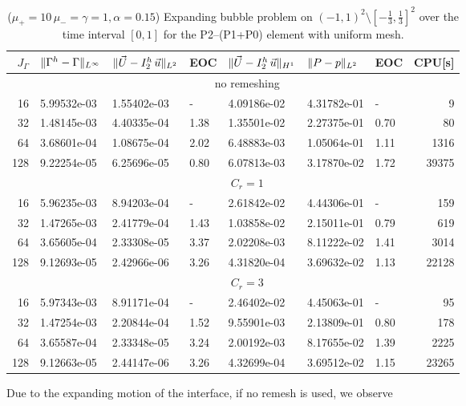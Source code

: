 \begin{table}
\center
\hspace*{-3.25cm}
\begin{tabular}{rllllllr}
\hline
$J_\Gamma$ & $\|\Gamma^h - \Gamma\|_{L^\infty}$ & $\|\vec U - I^h_{2}\,\vec u\|_{L^2}$ & EOC & $\|\vec U - I^h_{2}\,\vec u\|_{H^1}$ & $\|P - p\|_{L^2}$ & EOC
& CPU[s] \\
\hline
& \multicolumn{7}{c}{no remeshing} \\
\hline
 16 & 5.99532e-03 & 1.55402e-03 &    - & 4.09186e-02 & 4.31782e-01 &    - &
9 \\
 32 & 1.48145e-03 & 4.40335e-04 & 1.38 & 1.35501e-02 & 2.27375e-01 & 0.70 &
80 \\
 64 & 3.68601e-04 & 1.08675e-04 & 2.02 & 6.48883e-03 & 1.05064e-01 & 1.11 &
1316 \\
128 & 9.22254e-05 & 6.25696e-05 & 0.80 & 6.07813e-03 & 3.17870e-02 & 1.72 &
39375 \\
\hline
& \multicolumn{7}{c}{$C_r=1$} \\
\hline
 16 & 5.96235e-03 & 8.94203e-04 &    - & 2.61842e-02 & 4.44306e-01 &    - &
159 \\
 32 & 1.47265e-03 & 2.41779e-04 & 1.43 & 1.03858e-02 & 2.15011e-01 & 0.79 &
619 \\
 64 & 3.65605e-04 & 2.33308e-05 & 3.37 & 2.02208e-03 & 8.11222e-02 & 1.41 &
3014 \\
128 & 9.12693e-05 & 2.42966e-06 & 3.26 & 4.31820e-04 & 3.69632e-02 & 1.13 &
22128 \\
\hline
& \multicolumn{7}{c}{$C_r=3$} \\
\hline
 16 & 5.97343e-03 & 8.91171e-04 &    - & 2.46402e-02 & 4.45063e-01 &    - &
95 \\
 32 & 1.47254e-03 & 2.20844e-04 & 1.52 & 9.55901e-03 & 2.13809e-01 & 0.80 &
178 \\
 64 & 3.65587e-04 & 2.33348e-05 & 3.24 & 2.00192e-03 & 8.17655e-02 & 1.39 &
2225 \\
128 & 9.12663e-05 & 2.44147e-06 & 3.26 & 4.32699e-04 & 3.69512e-02 & 1.15 &
23265 \\
\hline
\end{tabular}
\hspace*{-3.25cm}
\caption[Stokes expanding bubble uniform mesh errors P2--(P1+P0)]
{($\mu_+ = 10\,\mu_- = \gamma = 1,\alpha = 0.15$) Expanding bubble
problem on $(-1,1)^2\setminus[-\frac{1}{3},\frac{1}{3}]^2$ over the time
interval $[0,1]$ for the P2--(P1+P0) element with uniform mesh.}
\label{tab:expandingbubble2Dp2p1p0}
\end{table}
Due to the expanding motion of the interface, if no remesh is used, we observe
